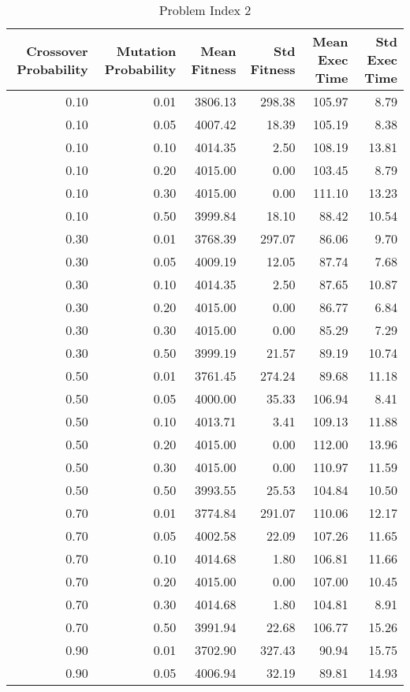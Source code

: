 \begin{table}
\caption{Problem Index 2}
\label{tab:problem_2}
\begin{tabular}{rrrrrr}
\toprule
Crossover Probability & Mutation Probability & Mean Fitness & Std Fitness & Mean Exec Time & Std Exec Time \\
\midrule
0.10 & 0.01 & 3806.13 & 298.38 & 105.97 & 8.79 \\
0.10 & 0.05 & 4007.42 & 18.39 & 105.19 & 8.38 \\
0.10 & 0.10 & 4014.35 & 2.50 & 108.19 & 13.81 \\
0.10 & 0.20 & 4015.00 & 0.00 & 103.45 & 8.79 \\
0.10 & 0.30 & 4015.00 & 0.00 & 111.10 & 13.23 \\
0.10 & 0.50 & 3999.84 & 18.10 & 88.42 & 10.54 \\
0.30 & 0.01 & 3768.39 & 297.07 & 86.06 & 9.70 \\
0.30 & 0.05 & 4009.19 & 12.05 & 87.74 & 7.68 \\
0.30 & 0.10 & 4014.35 & 2.50 & 87.65 & 10.87 \\
0.30 & 0.20 & 4015.00 & 0.00 & 86.77 & 6.84 \\
0.30 & 0.30 & 4015.00 & 0.00 & 85.29 & 7.29 \\
0.30 & 0.50 & 3999.19 & 21.57 & 89.19 & 10.74 \\
0.50 & 0.01 & 3761.45 & 274.24 & 89.68 & 11.18 \\
0.50 & 0.05 & 4000.00 & 35.33 & 106.94 & 8.41 \\
0.50 & 0.10 & 4013.71 & 3.41 & 109.13 & 11.88 \\
0.50 & 0.20 & 4015.00 & 0.00 & 112.00 & 13.96 \\
0.50 & 0.30 & 4015.00 & 0.00 & 110.97 & 11.59 \\
0.50 & 0.50 & 3993.55 & 25.53 & 104.84 & 10.50 \\
0.70 & 0.01 & 3774.84 & 291.07 & 110.06 & 12.17 \\
0.70 & 0.05 & 4002.58 & 22.09 & 107.26 & 11.65 \\
0.70 & 0.10 & 4014.68 & 1.80 & 106.81 & 11.66 \\
0.70 & 0.20 & 4015.00 & 0.00 & 107.00 & 10.45 \\
0.70 & 0.30 & 4014.68 & 1.80 & 104.81 & 8.91 \\
0.70 & 0.50 & 3991.94 & 22.68 & 106.77 & 15.26 \\
0.90 & 0.01 & 3702.90 & 327.43 & 90.94 & 15.75 \\
0.90 & 0.05 & 4006.94 & 32.19 & 89.81 & 14.93 \\

\end{tabular}
\end{table}
